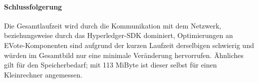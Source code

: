 \documentclass[parskip=full]{scrartcl}
\begin{document}
\paragraph{Schlussfolgerung}
Die Gesamtlaufzeit wird durch die Kommunikation mit dem Netzwerk, beziehungsweise durch das Hyperledger-SDK dominiert, Optimierungen an EVote-Komponenten sind aufgrund der kurzen Laufzeit derselbigen schwierig und würden im Gesamtbild nur eine minimale Veränderung hervorrufen. Ähnliches gilt für den Speicherbedarf; mit 113 MiByte ist dieser selbst für einen Kleinrechner angemessen.
\end{document}
